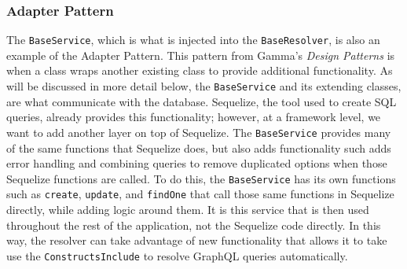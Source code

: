 \subsubsection{Adapter Pattern}
The \verb!BaseService!, which is what is injected into the \verb!BaseResolver!, is also an example of the Adapter Pattern.  This pattern from Gamma's \textit{Design Patterns} is when a class wraps another existing class to provide additional functionality.  As will be discussed in more detail below, the \verb!BaseService! and its extending classes, are what communicate with the database.  Sequelize, the tool used to create SQL queries, already provides this functionality; however, at a framework level, we want to add another layer on top of Sequelize.  The \verb!BaseService! provides many of the same functions that Sequelize does, but also adds functionality such adds error handling and combining queries to remove duplicated options when those Sequelize functions are called.  To do this, the \verb!BaseService! has its own functions such as \verb!create!, \verb!update!, and \verb!findOne! that call those same functions in Sequelize directly, while adding logic around them.  It is this service that is then used throughout the rest of the application, not the Sequelize code directly.  In this way, the resolver can take advantage of new functionality that allows it to take use the \verb!ConstructsInclude! to resolve GraphQL queries automatically.
